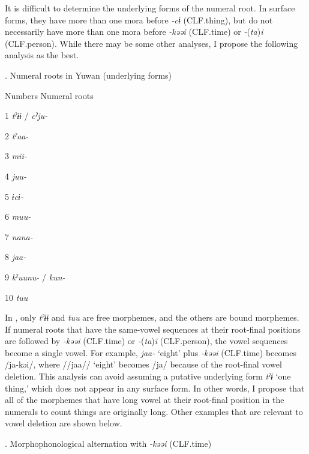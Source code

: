   It is difficult to determine the underlying forms of the numeral root. In surface forms, they have more than one mora before \textit{{}-cɨ} (CLF.thing), but do not necessarily have more than one mora before \textit{{}-kəəi} (CLF.time) or \textit{{}-}(\textit{ta})\textit{i} (CLF.person). While there may be some other analyses, I propose the following analysis as the best.

\begin{styleBeschriftung}
\textmd{}\textmd{. Numeral roots in Yuwan (underlying forms)}
\end{styleBeschriftung}

Numbers  Numeral roots

1  \textit{tˀɨɨ} / \textit{cˀju-}

2  \textit{tˀaa-}

3  \textit{mii-}

4  \textit{juu-}

5  \textit{ɨcɨ-}

6  \textit{muu-}

7  \textit{nana-}

8  \textit{jaa-}

9  \textit{kˀuunu-} / \textit{kun-}

10  \textit{tuu}

\begin{styleBeschriftung}
\textmd{In , only} \textmd{\textit{tˀɨɨ}}\textmd{ and} \textmd{\textit{tuu}}\textmd{ are free morphemes, and the others are bound morphemes. If numeral roots that have the same-vowel sequences at their root-final positions are followed by} \textmd{\textit{{}-kəəi}}\textmd{ (CLF.time) or} \textmd{\textit{{}-}}\textmd{(}\textmd{\textit{ta}}\textmd{)}\textmd{\textit{i} }\textmd{(CLF.person), the vowel sequences become a single vowel. For example,} \textmd{\textit{jaa-}}\textmd{ ‘eight’ plus} \textmd{\textit{{}-kəəi}}\textmd{ (CLF.time) becomes /ja-kəi/, where //jaa// ‘eight’ becomes /ja/ because of the root-final vowel deletion. This analysis} \textmd{can avoid assuming a putative underlying form} \textmd{\textit{tˀɨ}}\textmd{ ‘one thing,’ which does not appear in any surface form. In other words, I propose that all of the morphemes that have long vowel at their root-final position in the numerals to count things are originally long. Other examples that are relevant to vowel deletion are shown below.}
\end{styleBeschriftung}

\begin{styleBeschriftung}
\textmd{. Morphophonological alternation with} \textmd{\textit{{}-kəəi}}\textmd{ (CLF.time)}
\end{styleBeschriftung}

